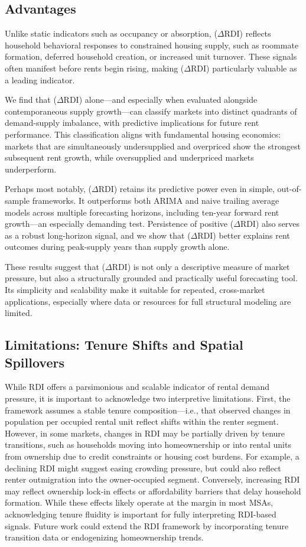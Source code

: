 \documentclass[APA,Times1COL]{WileyNJDv5} %
\begin{document}
\subsection{Advantages}
Unlike static indicators such as occupancy or absorption, (\(\Delta\text{RDI}\)) reflects household behavioral responses to constrained housing supply, such as roommate formation, deferred household creation, or increased unit turnover. These signals often manifest before rents begin rising, making (\(\Delta\text{RDI}\)) particularly valuable as a leading indicator.

We find that (\(\Delta\text{RDI}\)) alone—and especially when evaluated alongside contemporaneous supply growth—can classify markets into distinct quadrants of demand-supply imbalance, with predictive implications for future rent performance. This classification aligns with fundamental housing economics: markets that are simultaneously undersupplied and overpriced show the strongest subsequent rent growth, while oversupplied and underpriced markets underperform.

Perhaps most notably, (\(\Delta\text{RDI}\)) retains its predictive power even in simple, out-of-sample frameworks. It outperforms both ARIMA and naive trailing average models across multiple forecasting horizons, including ten-year forward rent growth—an especially demanding test. Persistence of positive (\(\Delta\text{RDI}\)) also serves as a robust long-horizon signal, and we show that (\(\Delta\text{RDI}\)) better explains rent outcomes during peak-supply years than supply growth alone.

These results suggest that (\(\Delta\text{RDI}\)) is not only a descriptive measure of market pressure, but also a structurally grounded and practically useful forecasting tool. Its simplicity and scalability make it suitable for repeated, cross-market applications, especially where data or resources for full structural modeling are limited.

\subsection{Limitations: Tenure Shifts and Spatial Spillovers}

While RDI offers a parsimonious and scalable indicator of rental demand pressure, it is important to acknowledge two interpretive limitations. First, the framework assumes a stable tenure composition—i.e., that observed changes in population per occupied rental unit reflect shifts within the renter segment. However, in some markets, changes in RDI may be partially driven by tenure transitions, such as households moving into homeownership or into rental units from ownership due to credit constraints or housing cost burdens. For example, a declining RDI might suggest easing crowding pressure, but could also reflect renter outmigration into the owner-occupied segment. Conversely, increasing RDI may reflect ownership lock-in effects or affordability barriers that delay household formation. While these effects likely operate at the margin in most MSAs, acknowledging tenure fluidity is important for fully interpreting RDI-based signals. Future work could extend the RDI framework by incorporating tenure transition data or endogenizing homeownership trends.
\end{document}
